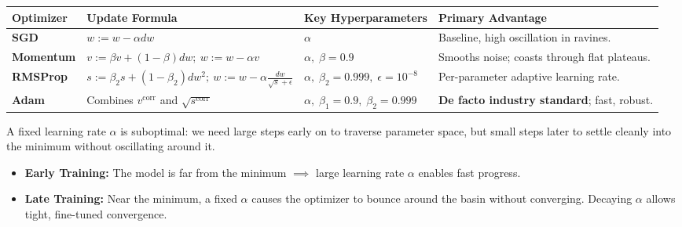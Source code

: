 \documentclass[10pt,a4paper]{article}
\begin{document}
\vspace{-2pt}

\par\vspace{1pt}
\begin{center}
\footnotesize
\setlength{\tabcolsep}{4pt}
\begin{tabularx}{\textwidth}{p{}p{}p{}>{\raggedright\arraybackslash}X}
\toprule
\rowcolor{lightbg}
\textbf{Optimizer} & \textbf{Update Formula} & \textbf{Key Hyperparameters} & \textbf{Primary Advantage} \\
\midrule
\textbf{SGD} & $w := w - \alpha dw$ & $\alpha$ & Baseline, high oscillation in ravines. \\
\midrule
\textbf{Momentum} & $v := \beta v + (1-\beta)dw; \ w := w - \alpha v$ & $\alpha, \; \beta = 0.9$ & Smooths noise; coasts through flat plateaus. \\
\midrule
\textbf{RMSProp} & $s := \beta_2 s + (1-\beta_2)dw^2; \ w := w - \alpha \frac{dw}{\sqrt{s}+\epsilon}$ & $\alpha, \; \beta_2 = 0.999, \; \epsilon = 10^{-8}$ & Per-parameter adaptive learning rate. \\
\midrule
\textbf{Adam} & Combines $v^{\text{corr}}$ and $\sqrt{s^{\text{corr}}}$ & $\alpha, \; \beta_1 = 0.9, \; \beta_2 = 0.999$ & \textbf{De facto industry standard}; fast, robust. \\
\bottomrule
\end{tabularx}
\end{center}

\newpage


\par\vspace{1pt}
A fixed learning rate $\alpha$ is suboptimal: we need large steps early on to traverse parameter space, but small steps later to settle cleanly into the minimum without oscillating around it.

\begin{itemize}[leftmargin=10pt, itemsep=1pt, topsep=0.5pt]
    \item \textbf{Early Training:} The model is far from the minimum $\implies$ large learning rate $\alpha$ enables fast progress.
    \item \textbf{Late Training:} Near the minimum, a fixed $\alpha$ causes the optimizer to bounce around the basin without converging. Decaying $\alpha$ allows tight, fine-tuned convergence.
\end{itemize}
\end{document}
